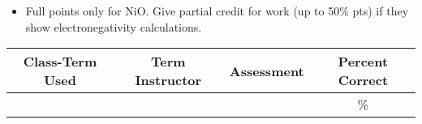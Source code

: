 \begin{rubric}

\begin{itemize}
	\item Full points only for NiO. Give partial credit for work (up to 50\% pts) if they show electronegativity calculations.
\end{itemize}

\end{rubric}

\begin{outcomes}
	\begin{center}
		\begin{tabular}{cccc}
			\hline\hline
			Class-Term Used & Term Instructor & Assessment & Percent Correct\\
			\hline
			 &  &  & \%\\    %
			\hline
		\end{tabular}
	\end{center}
\end{outcomes}

\begin{comments}

	
\end{comments}